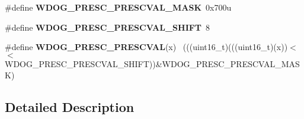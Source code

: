\begin{DoxyCompactItemize}
\item 
\hypertarget{group___w_d_o_g___register___masks_gaeadae4c65653a3302e69526730af1596}{}\#define {\bfseries W\+D\+O\+G\+\_\+\+P\+R\+E\+S\+C\+\_\+\+P\+R\+E\+S\+C\+V\+A\+L\+\_\+\+M\+A\+S\+K}~0x700u\label{group___w_d_o_g___register___masks_gaeadae4c65653a3302e69526730af1596}

\item 
\hypertarget{group___w_d_o_g___register___masks_gaa93b6acb20a8e20b687f05b8ced452c1}{}\#define {\bfseries W\+D\+O\+G\+\_\+\+P\+R\+E\+S\+C\+\_\+\+P\+R\+E\+S\+C\+V\+A\+L\+\_\+\+S\+H\+I\+F\+T}~8\label{group___w_d_o_g___register___masks_gaa93b6acb20a8e20b687f05b8ced452c1}

\item 
\hypertarget{group___w_d_o_g___register___masks_ga12a4ea6a8119ee62c26559f27423996f}{}\#define {\bfseries W\+D\+O\+G\+\_\+\+P\+R\+E\+S\+C\+\_\+\+P\+R\+E\+S\+C\+V\+A\+L}(x)                                  ~(((uint16\+\_\+t)(((uint16\+\_\+t)(x))$<$$<$W\+D\+O\+G\+\_\+\+P\+R\+E\+S\+C\+\_\+\+P\+R\+E\+S\+C\+V\+A\+L\+\_\+\+S\+H\+I\+F\+T))\&W\+D\+O\+G\+\_\+\+P\+R\+E\+S\+C\+\_\+\+P\+R\+E\+S\+C\+V\+A\+L\+\_\+\+M\+A\+S\+K)\label{group___w_d_o_g___register___masks_ga12a4ea6a8119ee62c26559f27423996f}

\end{DoxyCompactItemize}


\subsection{Detailed Description}
